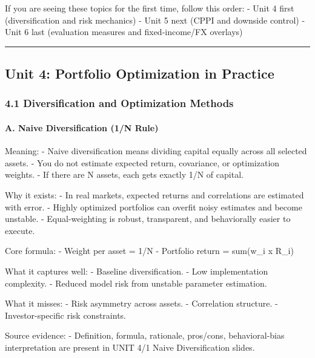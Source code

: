 \documentclass[
]{article}
\begin{document}
If you are seeing these topics for the first time, follow this order: -
Unit 4 first (diversification and risk mechanics) - Unit 5 next (CPPI
and downside control) - Unit 6 last (evaluation measures and
fixed-income/FX overlays)

\begin{center}\rule{0.5\linewidth}{0.5pt}\end{center}

\hypertarget{unit-4-portfolio-optimization-in-practice}{%
\subsection{Unit 4: Portfolio Optimization in
Practice}\label{unit-4-portfolio-optimization-in-practice}}

\hypertarget{diversification-and-optimization-methods}{%
\subsubsection{4.1 Diversification and Optimization
Methods}\label{diversification-and-optimization-methods}}

\hypertarget{a.-naive-diversification-1n-rule}{%
\paragraph{A. Naive Diversification (1/N
Rule)}\label{a.-naive-diversification-1n-rule}}

Meaning: - Naive diversification means dividing capital equally across
all selected assets. - You do not estimate expected return, covariance,
or optimization weights. - If there are N assets, each gets exactly 1/N
of capital.

Why it exists: - In real markets, expected returns and correlations are
estimated with error. - Highly optimized portfolios can overfit noisy
estimates and become unstable. - Equal-weighting is robust, transparent,
and behaviorally easier to execute.

Core formula: - Weight per asset = 1/N - Portfolio return = sum(w\_i x
R\_i)

What it captures well: - Baseline diversification. - Low implementation
complexity. - Reduced model risk from unstable parameter estimation.

What it misses: - Risk asymmetry across assets. - Correlation structure.
- Investor-specific risk constraints.

Source evidence: - Definition, formula, rationale, pros/cons,
behavioral-bias interpretation are present in UNIT 4/1 Naive
Diversification slides.
\end{document}
